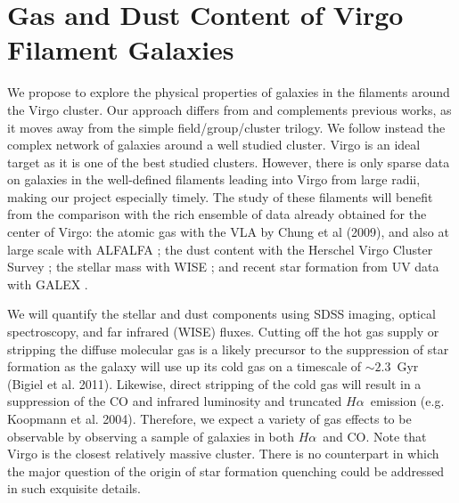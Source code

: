 \documentclass[12pt, preprint]{aastex}
\newcommand{\ha}{$H\alpha$}
\begin{document}
\vspace*{-.8cm}
\section{Gas and Dust Content of Virgo Filament Galaxies}
\vspace*{-.4cm}
We propose to explore the physical properties of
galaxies in the filaments around the Virgo cluster.   Our approach
differs from and complements previous works, as it moves away from the
simple field/group/cluster trilogy. We follow instead the complex
network of galaxies around a well studied cluster.  Virgo is an ideal
target as it is one of the best studied clusters.  However, there is
only sparse data on galaxies in the well-defined filaments leading
into Virgo from large radii, making our project especially timely.
The study of these filaments will benefit from the comparison with the rich
ensemble of data already obtained for the center of Virgo: the atomic
gas with the VLA by Chung
et al (2009), and also at large scale with ALFALFA \citep{giovanelli05}; the
dust content with the Herschel Virgo Cluster Survey \citep{davies10};
the stellar mass with WISE \citep{ferrarese12}; and recent star formation
from UV data with GALEX \citep{boselli11}. 


We will quantify the stellar and dust components using
SDSS imaging, optical spectroscopy, and
far infrared (WISE) fluxes.  Cutting off the hot gas supply or stripping the diffuse molecular gas
is a likely precursor to the suppression of star formation as the
galaxy will use up its cold gas on a timescale of $\sim 2.3$~Gyr
(Bigiel et al. 2011).  Likewise, direct stripping of the cold gas will
result in a suppression of the CO and infrared luminosity and
truncated \ha \ emission (e.g. Koopmann et al. 2004).  Therefore,
we expect a variety of gas effects to be observable by observing a
sample of galaxies in both \ha \ and CO.
Note that Virgo is the closest relatively massive cluster. There is no counterpart
in which the major question of the origin of star formation quenching could be
addressed in such exquisite details.

\end{document}
